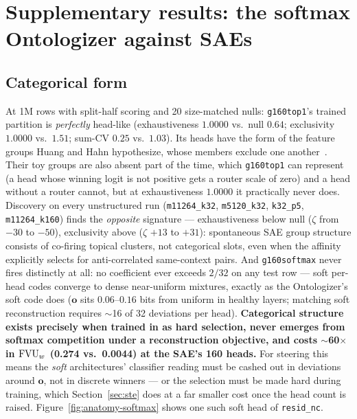 \section{Supplementary results: the softmax Ontologizer against SAEs}
\label{app:soft}

\subsection{Categorical form}
\label{sec:categorical}

At 1M rows with split-half scoring and 20 size-matched nulls:
\texttt{g160top1}'s trained partition is \emph{perfectly} head-like
(exhaustiveness $1.0000$ vs.\ null $0.64$; exclusivity $1.0000$ vs.\
$1.51$; sum-CV $0.25$ vs.\ $1.03$). Its heads have the form of the
feature groups Huang and Hahn hypothesize, whose members exclude one
another~\cite{huang2025decomposing}. Their toy groups are also absent part
of the time, which \texttt{g160top1} can represent (a head whose winning
logit is not positive gets a router scale of zero) and a head without a
router cannot, but at exhaustiveness $1.0000$ it practically never does. Discovery on every
unstructured run (\texttt{m11264\_k32}, \texttt{m5120\_k32}, \texttt{k32\_p5},
\texttt{m11264\_k160}) finds the \emph{opposite} signature ---
exhaustiveness below null ($\zeta$ from $-30$ to $-50$), exclusivity above
($\zeta$ $+13$ to $+31$): spontaneous SAE group structure consists of
co-firing topical clusters, not categorical slots, even when the affinity
explicitly selects for anti-correlated same-context pairs. And
\texttt{g160softmax} never fires distinctly at all: no coefficient ever
exceeds $2/32$ on any test row --- soft per-head codes converge to dense
near-uniform mixtures, exactly as the Ontologizer's soft code does
($\mathbf{o}$ sits $0.06$--$0.16$ bits from uniform in healthy layers;
matching soft reconstruction requires $\sim$16 of 32 deviations per head).
\textbf{Categorical structure exists precisely when trained in as hard
selection, never emerges from softmax competition under a reconstruction
objective, and costs $\sim$60$\times$ in $\mathrm{FVU}_w$ (0.274 vs.\ 0.0044)
at the SAE's 160 heads.} For steering this means the \emph{soft}
architectures' classifier reading must be cashed out in deviations around
$\mathbf{o}$, not in discrete winners --- or the selection must be
made hard during training, which Section~\ref{sec:ste} does at a far
smaller cost once the head count is raised.
Figure~\ref{fig:anatomy-softmax} shows one such soft head of
\texttt{resid\_nc}.

